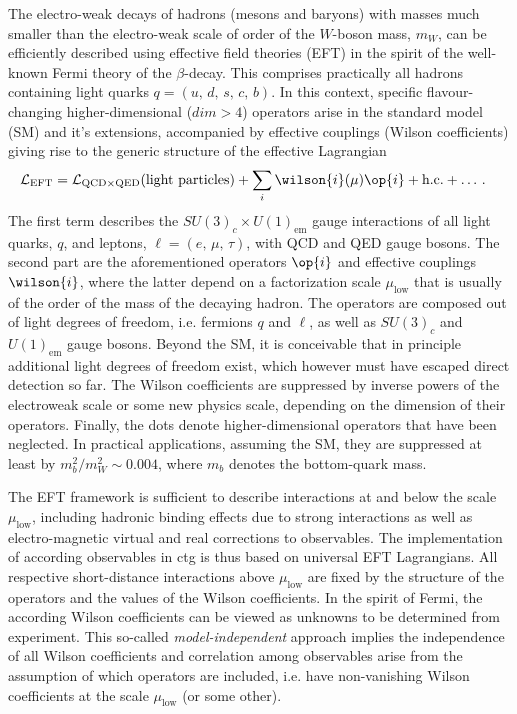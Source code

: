 The electro-weak decays of hadrons (mesons and baryons) with masses much smaller
than the electro-weak scale of order of the $W$-boson mass, $m_W$, can be efficiently
described using effective field theories (EFT) in the spirit of the well-known
Fermi theory of the $\beta$-decay. This comprises practically all hadrons containing
light quarks $q = (u,\,d,\,s,\,c,\,b)$. In this context, specific flavour-changing
higher-dimensional ($dim > 4$) operators arise in the standard model (SM) and
it's extensions, accompanied by effective couplings (Wilson coefficients) giving
rise to the generic structure of the effective Lagrangian
\begin{align}
  {\cal L}_{\text{EFT}} &
  = {\cal L}_{\text{QCD} \times \text{QED}} (\mbox{light particles})
  + \sum_i \wilson{i}(\mu) \op{i} + \mbox{h.c.} + \ldots \,.
\end{align} 
The first term describes the $SU(3)_c \times U(1)_\text{em}$
gauge interactions of all light quarks, $q$, and leptons, $\ell = (e,\,\mu,\,\tau)$,
with QCD and QED gauge bosons. The second part are the aforementioned operators
$\op{i}$ and effective couplings $\wilson{i}$, where the latter depend on a
factorization scale $\mu_\text{low}$ that is usually of the order of the mass of the
decaying hadron. The operators are composed out of light degrees of freedom, i.e. fermions
$q$ and $\ell$, as well as $SU(3)_c$ and $U(1)_\text{em}$ gauge bosons. Beyond
the SM, it is conceivable that in principle additional light degrees of freedom
exist, which however must have escaped direct detection so far.
The Wilson coefficients are suppressed by inverse powers of the electroweak
scale or some new physics scale, depending on the dimension of their operators.
Finally, the dots denote higher-dimensional operators that have been neglected.
In practical applications, assuming the SM, they are suppressed at least by
$m_b^2/m_W^2 \sim 0.004$, where $m_b$ denotes the bottom-quark mass.

The EFT framework is sufficient to describe interactions at and below the scale
$\mu_\text{low}$, including hadronic binding effects due to strong interactions
as well as electro-magnetic virtual and real corrections to observables. The
implementation of according observables in ctg is thus based on universal EFT 
Lagrangians. All respective short-distance interactions above $\mu_\text{low}$ are
fixed by the structure of the operators and the values of the Wilson coefficients.
In the spirit of Fermi, the according Wilson coefficients can be viewed as unknowns
to be determined from experiment. This so-called {\em model-independent} approach
implies the independence of all Wilson coefficients and correlation among observables
arise from the assumption of which operators are included, i.e. have non-vanishing
Wilson coefficients at the scale $\mu_\text{low}$ (or some other). 

